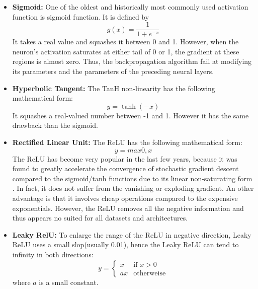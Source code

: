 \begin{itemize}
	\item \textbf{Sigmoid:} One of the oldest and historically most commonly used activation function is sigmoid function. It is defined by
	\begin{equation}
	g(x)=\frac{1}{1+e^{-x}}
	\end{equation}
	It takes a real value and squashes it between 0 and 1. However, when the neuron’s activation
	saturates at either tail of 0 or 1, the gradient at these regions is almost zero. Thus, the backpropagation algorithm fail at modifying its parameters and the parameters of the preceding neural layers.
	
	\item \textbf{Hyperbolic Tangent:} The TanH non-linearity has the following mathematical form:
	\begin{equation}
	y=\tanh(-x)
	\end{equation}
	It squashes a real-valued number between -1 and 1. However it has the same drawback than the sigmoid.
	
	\item \textbf{Rectified Linear Unit:} The ReLU has the following mathematical form:
	\begin{equation}
	y=max{0,x}
	\end{equation}
	The ReLU has become very  popular in the last few years, because it was found to greatly accelerate the convergence of stochastic gradient descent compared to the sigmoid/tanh functions due to its linear non-saturating form \cite{krizhevsky2012imagenet}. In fact, it does not suffer from the vanishing or exploding gradient. An other advantage is that it involves cheap operations compared to the expensive exponentials. However, the ReLU removes all the negative information and thus appears no suited for all datasets and architectures.
	
	\item \textbf{Leaky RelU:} To enlarge the range of the ReLU in negative direction, Leaky ReLU uses a small slop(usually 0.01), hence the Leaky ReLU can tend to infinity in both directions:
	\begin{equation}
	y=\begin{cases} x & \text{if $x>0$}  \\
	ax & \text{otherweise}
	\end{cases}
	\end{equation}
	where $a$ is a small constant.	
\end{itemize}


